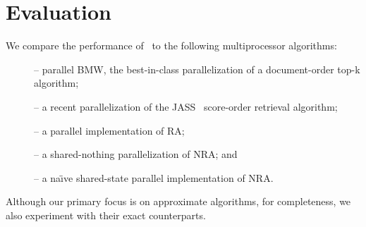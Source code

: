 \section{Evaluation} \label{sec:eval}

We compare the performance of \alg\ to the following multiprocessor algorithms: 
\begin{description}
\item[\pBMW]\cite{rojas2013efficient} -- parallel BMW,  
the best-in-class parallelization of a document-order top-k algorithm; 
\item[\pJASS]\cite{parallel-jass} -- a recent parallelization of the JASS~\cite{Lin:2015} score-order retrieval algorithm; 
\item[\pRA]-- a parallel implementation of RA;
\item[\sNRA]--  a shared-nothing  parallelization of NRA; and 
\item [\pNRA]-- a
na\"{\i}ve shared-state parallel implementation of NRA. 
\end{description}
Although our primary focus is on  approximate 
algorithms, for completeness, we also experiment with their exact counterparts.
%

